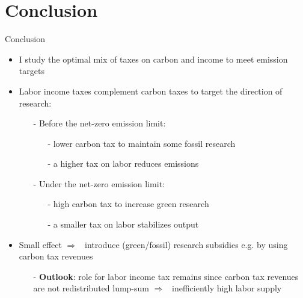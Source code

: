 \documentclass[11pt,aspectratio=169]{beamer}
\newcommand{\ar}{$\Rightarrow$ \ }
\begin{document}
\section{Conclusion}
\begin{frame}{Conclusion}
	\begin{itemize}[<+-| alert@+>]
		\item I study the optimal mix of taxes on carbon and income to meet emission targets
		\vspace{3mm}
		\item Labor income taxes complement carbon taxes to target the direction of research:
		\vspace{2mm}
		\begin{itemize}
			\item[-] Before the net-zero emission limit: 
			\begin{itemize}
				\item[-] lower carbon tax to maintain some fossil research
				\item[-] a higher tax on labor reduces emissions
			\end{itemize}
			\vspace{3mm}
			\item[-] Under the net-zero emission limit: 
			\begin{itemize}
				\item[-] high carbon tax to increase green research
				\item[-]  a smaller tax on labor stabilizes output
			\end{itemize}
		\end{itemize}
		\vspace{3mm}
		\item Small effect \ar introduce (green/fossil) research subsidies e.g. by using carbon tax revenues
		\vspace{2mm}
		
		\begin{itemize}
			\item[-] \textbf{Outlook}: role for labor income tax remains since carbon tax revenues are not redistributed lump-sum \ar inefficiently high labor supply %
		\end{itemize}	
		
		
	\end{itemize}
\end{frame}
\end{document}
